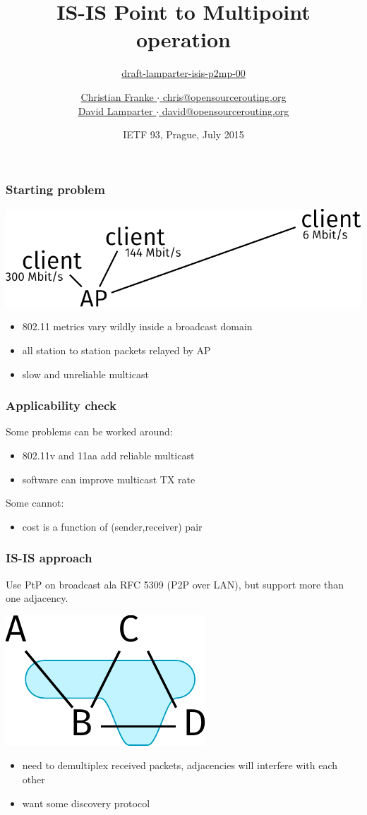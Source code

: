 \documentclass[12pt]{beamer}
\title{IS-IS Point to Multipoint operation}
\subtitle{%
  \href{https://datatracker.ietf.org/doc/draft-lamparter-isis-p2mp/}{draft-lamparter-isis-p2mp-00}
}
\author{%
\href{mailto:chris@opensourcerouting.org}{Christian Franke $\cdot$ chris@opensourcerouting.org}\\%
\underline{\href{mailto:david@opensourcerouting.org}{David Lamparter $\cdot$ david@opensourcerouting.org}}%
}
\date{IETF 93, Prague, July 2015}
\begin{document}
\begin{frame}
  \titlepage
\end{frame}

\begin{frame}
  \frametitle{Starting problem}
  \includegraphics[scale=0.65,angle=0]{isis_93_wifitopo.pdf}%
  \vspace{5mm}
  \begin{itemize}
    \item 802.11 metrics vary wildly inside a broadcast domain
    \item all station to station packets relayed by AP
    \item slow and unreliable multicast
  \end{itemize}
\end{frame}

\begin{frame}
  \frametitle{Applicability check}
  Some problems can be worked around:
  \begin{itemize}
    \item 802.11v and 11aa add reliable multicast
    \item software can improve multicast TX rate
  \end{itemize}
  Some cannot:
  \begin{itemize}
    \item cost is a function of (sender,receiver) pair
  \end{itemize}
\end{frame}

\begin{frame}
  \frametitle{IS-IS approach}

  Use PtP on broadcast ala RFC 5309 (P2P over LAN), but support more than one adjacency.

  \vspace{5mm}
  \includegraphics[scale=0.65,angle=0]{isis_93_p2mplink.pdf}%
  \vspace{5mm}

  \begin{itemize}
    \item need to demultiplex received packets, adjacencies will interfere with each other
    \item want some discovery protocol
  \end{itemize}
\end{frame}
\end{document}
